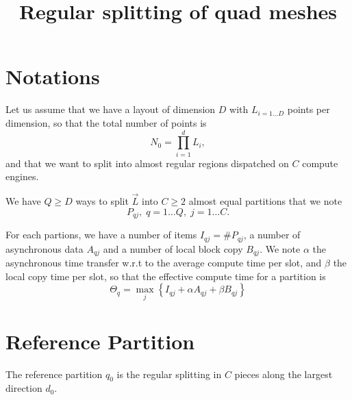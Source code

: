\documentclass[aps,12pt]{revtex4}
\begin{document}
\title{Regular splitting of quad meshes}
\maketitle

\section{Notations}
Let us assume that we have a layout of dimension $D$
with $L_{i=1\ldots D}$ points per dimension, so
that the total number of points is
$$
	N_0 = \prod_{i=1}^{d} L_i,
$$
and that we want to split into almost regular regions
dispatched on $C$ compute engines.

We have $Q\geq D$ ways to split $\vec{L}$ into $C\geq2$ almost equal partitions
that we note 
$$P_{qj},\;q=1\ldots Q,\;j=1\ldots C.$$

For each partions, we have a number of items $I_{qj} = \# P_{qj}$, a
number of asynchronous data $A_{qj}$ and a number of local block copy $B_{qj}$.
We note $\alpha$ the asynchronous time transfer w.r.t to the average
compute time per slot, and $\beta$ the local copy time per slot, so that
the effective compute time for a partition is
$$
	\Theta_q = \max_{j}\left\lbrace  I_{qj} + \alpha A_{qj} + \beta B_{qj} \right\rbrace
$$

\section{Reference Partition}
The reference partition $q_0$ is the regular splitting in $C$ pieces
along the largest direction $d_0$.
\end{document}
